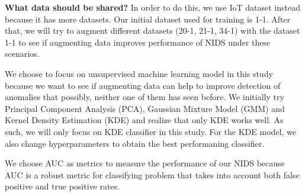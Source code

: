 \begin{method}
\textbf{What data should be shared?} In order to do this, we use IoT dataset instead because it has more datasets. Our initial dataset used for training is 1-1. After that, we will try to augment different datasets (20-1, 21-1, 34-1) with the dataset 1-1 to see if augmenting data improves performance of NIDS under these scenarios.

 We choose to focus on unsupervised machine learning model in this study because we want to see if augmenting data can help to improve detection of anomalies that possibly, neither one of them has seen before. We initially try Principal Component Analysis (PCA), Gaussian Mixture Model (GMM) and Kernel Density Estimation (KDE) and realize that only KDE works well. As such, we will only focus on KDE classifier in this study.
For the KDE model, we also change hyperparameters to obtain the best performaning classifier. 



 We choose AUC as metrics to measure the performance of our NIDS because AUC is a robust metric for classifying problem that takes into account both false positive and true positive rates.


\end{method}
